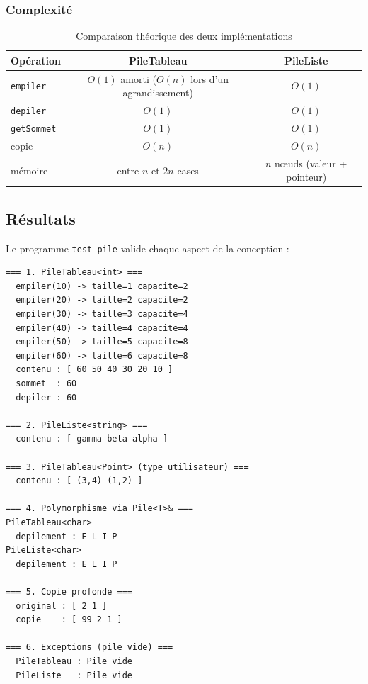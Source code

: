 \documentclass[11pt,a4paper]{article}
\newcommand{\code}[1]{\texttt{#1}}
\begin{document}
\subsubsection{Complexité}

\begin{table}[H]
\centering
\begin{tabular}{lcc}
  \toprule
  \textbf{Opération} & \textbf{PileTableau} & \textbf{PileListe} \\
  \midrule
  \code{empiler}    & $O(1)$ amorti ($O(n)$ lors d'un agrandissement) & $O(1)$ \\
  \code{depiler}    & $O(1)$ & $O(1)$ \\
  \code{getSommet}  & $O(1)$ & $O(1)$ \\
  copie             & $O(n)$ & $O(n)$ \\
  mémoire           & entre $n$ et $2n$ cases & $n$ n\oe{}uds (valeur + pointeur) \\
  \bottomrule
\end{tabular}
\caption{Comparaison théorique des deux implémentations}
\end{table}

\subsection{Résultats}

Le programme \code{test\_pile} valide chaque aspect de la conception :

\begin{lstlisting}[style=sortie, caption={Extrait de la sortie de \code{test\_pile}}]
=== 1. PileTableau<int> ===
  empiler(10) -> taille=1 capacite=2
  empiler(20) -> taille=2 capacite=2
  empiler(30) -> taille=3 capacite=4
  empiler(40) -> taille=4 capacite=4
  empiler(50) -> taille=5 capacite=8
  empiler(60) -> taille=6 capacite=8
  contenu : [ 60 50 40 30 20 10 ]
  sommet  : 60
  depiler : 60

=== 2. PileListe<string> ===
  contenu : [ gamma beta alpha ]

=== 3. PileTableau<Point> (type utilisateur) ===
  contenu : [ (3,4) (1,2) ]

=== 4. Polymorphisme via Pile<T>& ===
PileTableau<char>
  depilement : E L I P
PileListe<char>
  depilement : E L I P

=== 5. Copie profonde ===
  original : [ 2 1 ]
  copie    : [ 99 2 1 ]

=== 6. Exceptions (pile vide) ===
  PileTableau : Pile vide
  PileListe   : Pile vide
\end{lstlisting}
\end{document}
